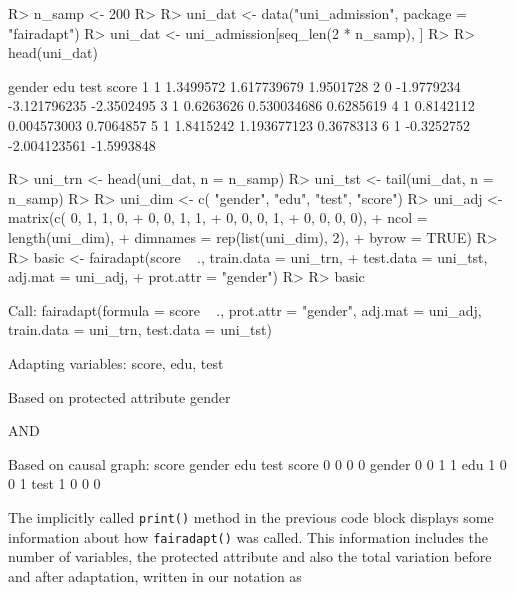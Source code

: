 \documentclass[
  nojss]{jss}
\begin{document}
\begin{CodeChunk}
\begin{CodeInput}
R> n_samp <- 200
R> 
R> uni_dat <- data("uni_admission", package = "fairadapt")
R> uni_dat <- uni_admission[seq_len(2 * n_samp), ]
R> 
R> head(uni_dat)
\end{CodeInput}
\begin{CodeOutput}
  gender        edu         test      score
1      1  1.3499572  1.617739679  1.9501728
2      0 -1.9779234 -3.121796235 -2.3502495
3      1  0.6263626  0.530034686  0.6285619
4      1  0.8142112  0.004573003  0.7064857
5      1  1.8415242  1.193677123  0.3678313
6      1 -0.3252752 -2.004123561 -1.5993848
\end{CodeOutput}
\begin{CodeInput}
R> uni_trn <- head(uni_dat, n = n_samp)
R> uni_tst <- tail(uni_dat, n = n_samp)
R> 
R> uni_dim <- c(       "gender", "edu", "test", "score")
R> uni_adj <- matrix(c(       0,     1,      1,       0,
+                             0,     0,      1,       1,
+                             0,     0,      0,       1,
+                             0,     0,      0,       0),
+                   ncol = length(uni_dim),
+                   dimnames = rep(list(uni_dim), 2),
+                   byrow = TRUE)
R> 
R> basic <- fairadapt(score ~ ., train.data = uni_trn,
+                     test.data = uni_tst, adj.mat = uni_adj,
+                     prot.attr = "gender")
R> 
R> basic
\end{CodeInput}
\begin{CodeOutput}

Call:
fairadapt(formula = score ~ ., prot.attr = "gender", adj.mat = uni_adj, 
    train.data = uni_trn, test.data = uni_tst)


Adapting variables:
  score, edu, test

Based on protected attribute gender 

  AND

Based on causal graph:
       score gender edu test
score      0      0   0    0
gender     0      0   1    1
edu        1      0   0    1
test       1      0   0    0
\end{CodeOutput}
\end{CodeChunk}

The implicitly called \texttt{print()} method in the previous code block
displays some information about how \texttt{fairadapt()} was called.
This information includes the number of variables, the protected
attribute and also the total variation before and after adaptation,
written in our notation as
\end{document}
